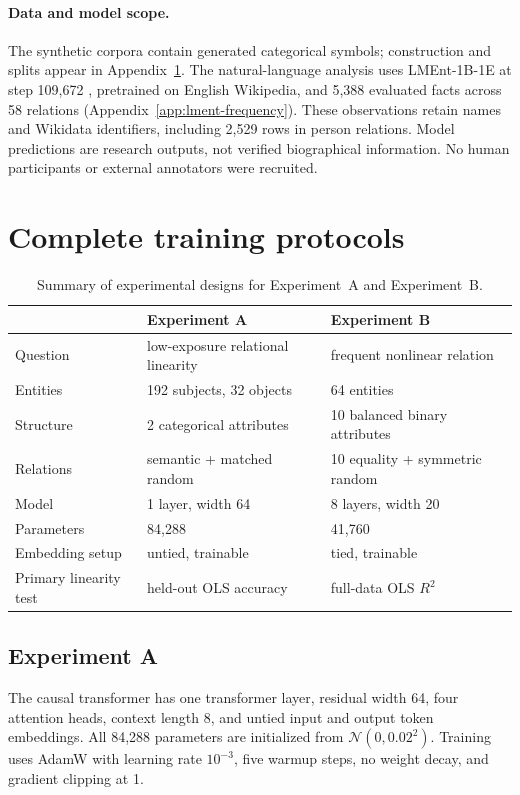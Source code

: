 \documentclass[11pt]{article}
\begin{document}
\paragraph{Data and model scope.}
The synthetic corpora contain generated categorical symbols; construction and
splits appear in Appendix~\ref{app:training}. The natural-language analysis uses
LMEnt-1B-1E at step 109,672 \citep{gottesman2025lment}, pretrained on English
Wikipedia, and 5,388 evaluated facts across 58 relations
(Appendix~\ref{app:lment-frequency}). These observations retain names and
Wikidata identifiers, including 2,529 rows in person relations. Model predictions
are research outputs, not verified biographical information. No human
participants or external annotators were recruited.


\section{Complete training protocols}
\label{app:training}

\begin{table}[t]
\centering
\small
\begin{tabular}{lll}
\toprule
 & Experiment A & Experiment B \\
\midrule
Question & low-exposure relational linearity & frequent nonlinear relation \\
Entities & 192 subjects, 32 objects & 64 entities \\
Structure & 2 categorical attributes & 10 balanced binary attributes \\
Relations & semantic + matched random & 10 equality + symmetric random \\
Model & 1 layer, width 64 & 8 layers, width 20 \\
Parameters & 84,288 & 41,760 \\
Embedding setup & untied, trainable & tied, trainable \\
Primary linearity test & held-out OLS accuracy & full-data OLS $R^2$ \\
\bottomrule
\end{tabular}
\caption{Summary of experimental designs for Experiment~A and Experiment~B.}
\label{tab:design}
\end{table}

\subsection{Experiment A}

The causal transformer has one transformer layer, residual width 64, four
attention heads, context length 8, and untied input and output token embeddings.
All 84,288 parameters are initialized from $\mathcal{N}(0,0.02^2)$. Training
uses AdamW with learning rate $10^{-3}$, five warmup steps, no weight decay, and
gradient clipping at 1.
\end{document}
